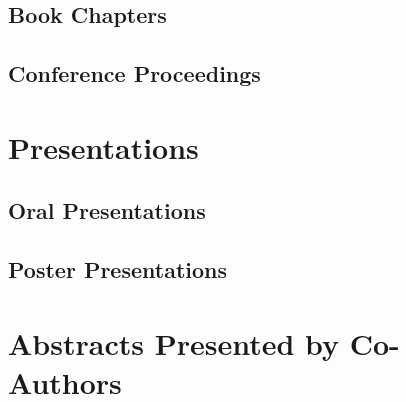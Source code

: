 \documentclass[%
]{komacv}
\begin{document}
\begin{refcontext}[]
\nocite{*}
\printbibliography[, keyword=review, heading=none, resetnumbers=true]
\end{refcontext}

\subsection{Book Chapters}

\begin{refcontext}[]
\nocite{*}
\printbibliography[keyword=book, heading=none, resetnumbers=true]
\end{refcontext}

\subsection{Conference Proceedings}

\begin{refcontext}[]
\nocite{*}
\printbibliography[keyword=proceeding, heading=none, resetnumbers=true]
\end{refcontext}

\section{Presentations}

\subsection{Oral Presentations}

\begin{refcontext}[]
\nocite{*}
\printbibliography[keyword=talk, heading=none, resetnumbers=true]
\end{refcontext}

\subsection{Poster Presentations}

\begin{refcontext}[]
\nocite{*}
\printbibliography[keyword=poster, heading=none, resetnumbers=true]
\end{refcontext}

\section{Abstracts Presented by Co-Authors}
\end{document}
